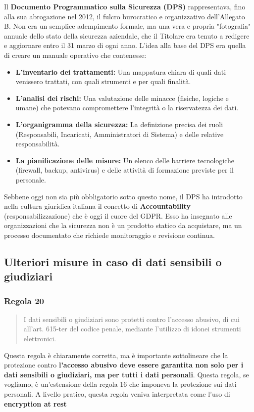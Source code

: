 Il \textbf{Documento Programmatico sulla Sicurezza (DPS)} rappresentava, fino alla sua abrogazione nel 2012, il fulcro burocratico e organizzativo dell'Allegato B. Non era un semplice adempimento formale, ma una vera e propria "fotografia" annuale dello stato della sicurezza aziendale, che il Titolare era tenuto a redigere e aggiornare entro il 31 marzo di ogni anno.
L'idea alla base del DPS era quella di creare un manuale operativo che contenesse:
\begin{itemize}
    \item \textbf{L'inventario dei trattamenti:} Una mappatura chiara di quali dati venissero trattati, con quali strumenti e per quali finalità.
    \item \textbf{L'analisi dei rischi:} Una valutazione delle minacce (fisiche, logiche e umane) che potevano compromettere l'integrità o la riservatezza dei dati.
    \item \textbf{L'organigramma della sicurezza:} La definizione precisa dei ruoli (Responsabili, Incaricati, Amministratori di Sistema) e delle relative responsabilità.
    \item \textbf{La pianificazione delle misure:} Un elenco delle barriere tecnologiche (firewall, backup, antivirus) e delle attività di formazione previste per il personale.
\end{itemize}

Sebbene oggi non sia più obbligatorio sotto questo nome, il DPS ha introdotto nella cultura giuridica italiana il concetto di \textbf{Accountability} (responsabilizzazione) che è oggi il cuore del GDPR.
Esso ha insegnato alle organizzazioni che la sicurezza non è un prodotto statico da acquistare, ma un processo documentato che richiede monitoraggio e revisione continua.
\subsection{Ulteriori misure in caso di dati sensibili o giudiziari}
\subsubsection*{Regola 20}
\begin{quote}
    I dati sensibili o giudiziari sono protetti contro l'accesso abusivo, di cui all'art. 615-ter del codice penale, mediante l'utilizzo di idonei strumenti elettronici.
\end{quote}
Questa regola è chiaramente corretta, ma è importante sottolineare che la protezione contro \textbf{l'accesso abusivo deve essere garantita non solo per i dati sensibili o giudiziari, ma per tutti i dati personali}.
Questa regola, se vogliamo, è un'estensione della regola 16 che imponeva la protezione sui dati personali.
A livello pratico, questa regola veniva interpretata come l'uso di \textbf{encryption at rest}

